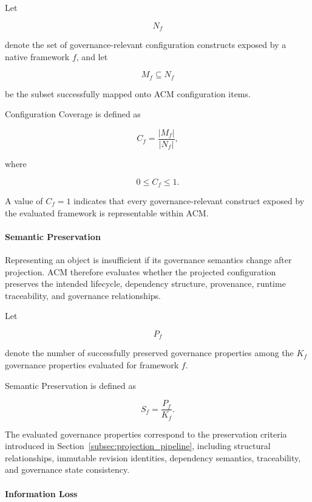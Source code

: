 \documentclass[10pt]{article}
\begin{document}
Let

\[
N_f
\]

denote the set of governance-relevant configuration constructs exposed by a
native framework \(f\), and let

\[
M_f \subseteq N_f
\]

be the subset successfully mapped onto ACM configuration items.

Configuration Coverage is defined as

\begin{equation}
C_f =
\frac{|M_f|}
{|N_f|},
\label{eq:coverage}
\end{equation}

where

\[
0 \le C_f \le 1.
\]

A value of \(C_f=1\) indicates that every governance-relevant construct exposed
by the evaluated framework is representable within ACM.

\paragraph{Semantic Preservation}

Representing an object is insufficient if its governance semantics change after
projection. ACM therefore evaluates whether the projected configuration
preserves the intended lifecycle, dependency structure, provenance, runtime
traceability, and governance relationships.

Let

\[
P_f
\]

denote the number of successfully preserved governance properties among the
\(K_f\) governance properties evaluated for framework \(f\).

Semantic Preservation is defined as

\begin{equation}
S_f =
\frac{P_f}
{K_f}.
\label{eq:semantic_preservation}
\end{equation}

The evaluated governance properties correspond to the preservation criteria
introduced in Section~\ref{subsec:projection_pipeline}, including structural
relationships, immutable revision identities, dependency semantics,
traceability, and governance state consistency.

\paragraph{Information Loss}
\end{document}
